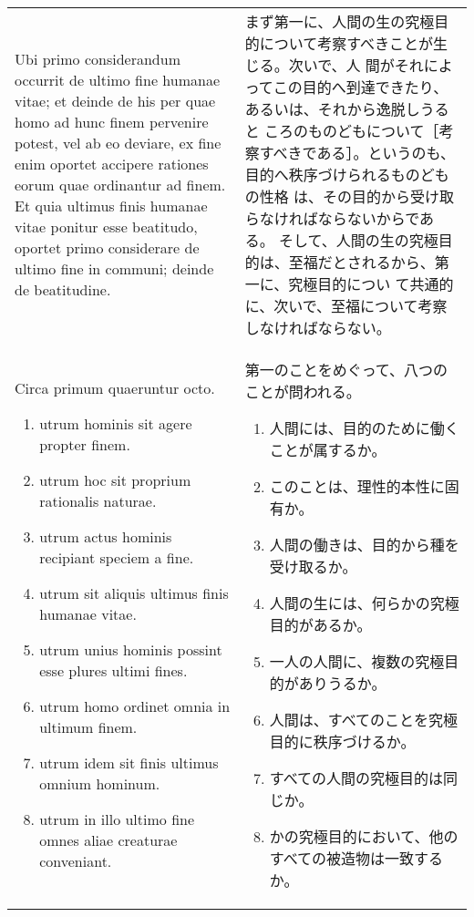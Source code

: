\documentclass[10pt]{jsarticle} %
\begin{document}
\begin{longtable}{p{21em}p{21em}}
Ubi primo considerandum occurrit de ultimo fine humanae vitae; et deinde
de his per quae homo ad hunc finem pervenire potest, vel ab eo deviare,
ex fine enim oportet accipere rationes eorum quae ordinantur ad
finem. Et quia ultimus finis humanae vitae ponitur esse beatitudo,
oportet primo considerare de ultimo fine in communi; deinde de
beatitudine. 


&


まず第一に、人間の生の究極目的について考察すべきことが生じる。次いで、人
 間がそれによってこの目的へ到達できたり、あるいは、それから逸脱しうると
 ころのものどもについて［考察すべきである］。というのも、目的へ秩序づけられるものどもの性格
 は、その目的から受け取らなければならないからである。
そして、人間の生の究極目的は、至福だとされるから、第一に、究極目的につい
 て共通的に、次いで、至福について考察しなければならない。


\\

Circa primum quaeruntur octo. 

\begin{enumerate}
 \item utrum hominis sit agere propter finem.
 \item utrum hoc sit proprium rationalis naturae.
 \item utrum actus hominis recipiant speciem a fine.
 \item utrum sit aliquis ultimus finis humanae vitae.
 \item utrum unius hominis possint esse plures ultimi fines.
 \item utrum homo ordinet omnia in ultimum finem.
 \item utrum idem sit finis ultimus omnium hominum.
 \item utrum in illo ultimo fine omnes aliae creaturae conveniant.
\end{enumerate}


&

第一のことをめぐって、八つのことが問われる。
\begin{enumerate}
 \item 人間には、目的のために働くことが属するか。
 \item このことは、理性的本性に固有か。
 \item 人間の働きは、目的から種を受け取るか。
 \item 人間の生には、何らかの究極目的があるか。
 \item 一人の人間に、複数の究極目的がありうるか。
 \item 人間は、すべてのことを究極目的に秩序づけるか。
 \item すべての人間の究極目的は同じか。
 \item かの究極目的において、他のすべての被造物は一致するか。
\end{enumerate}

\end{longtable}
\end{document}
